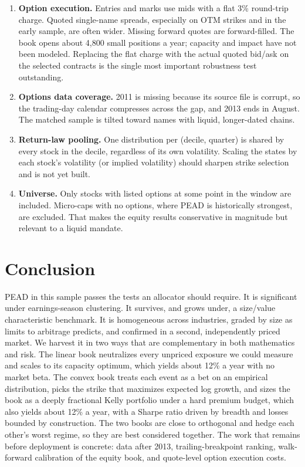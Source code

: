 \documentclass[11pt]{article}
\theoremstyle{definition}
\newcommand{\1}{\mathbf{1}}
\begin{document}
\begin{enumerate}
\item \textbf{Option execution.} Entries and marks use mids with a flat 3\% round-trip
      charge. Quoted single-name spreads, especially on OTM strikes and in the early
      sample, are often wider. Missing forward quotes are forward-filled. The book opens
      about 4{,}800 small positions a year; capacity and impact
      have not been modeled. Replacing the flat charge with the actual quoted bid/ask on
      the selected contracts is the single most important robustness test outstanding.
\item \textbf{Options data coverage.} 2011 is missing because its source file is corrupt,
      so the trading-day calendar compresses across the gap, and 2013 ends in August. The
      matched sample is tilted toward names with liquid, longer-dated chains.
\item \textbf{Return-law pooling.} One distribution per (decile, quarter) is shared by every
      stock in the decile, regardless of its own volatility. Scaling the states by each
      stock's volatility (or implied volatility) should sharpen strike selection and is not
      yet built.
\item \textbf{Universe.} Only stocks with listed options at some point in the window are
      included. Micro-caps with no options, where PEAD is historically strongest, are
      excluded. That makes the equity results conservative in magnitude but relevant to a
      liquid mandate.
\end{enumerate}

\section{Conclusion}

PEAD in this sample passes the tests an allocator should require. It is significant under
earnings-season clustering. It survives, and grows under, a size/value characteristic
benchmark. It is homogeneous across industries, graded by size as limits to arbitrage
predicts, and confirmed in a second, independently priced market. We harvest it in two
ways that are complementary in both mathematics and risk. The linear book neutralizes every
unpriced exposure we could measure and scales to its capacity optimum, which yields about
12\% a year with no market beta. The convex book treats each event as a bet on an
empirical distribution, picks the strike that maximizes expected log growth, and sizes the
book as a deeply fractional Kelly portfolio under a hard premium budget, which also yields
about 12\% a year, with a Sharpe ratio driven by breadth and losses bounded by
construction. The two books are close to orthogonal and hedge each other's worst regime,
so they are best considered together. The work that remains before deployment is concrete:
data after 2013, trailing-breakpoint ranking, walk-forward calibration of the equity book,
and quote-level option execution costs.
\end{document}
